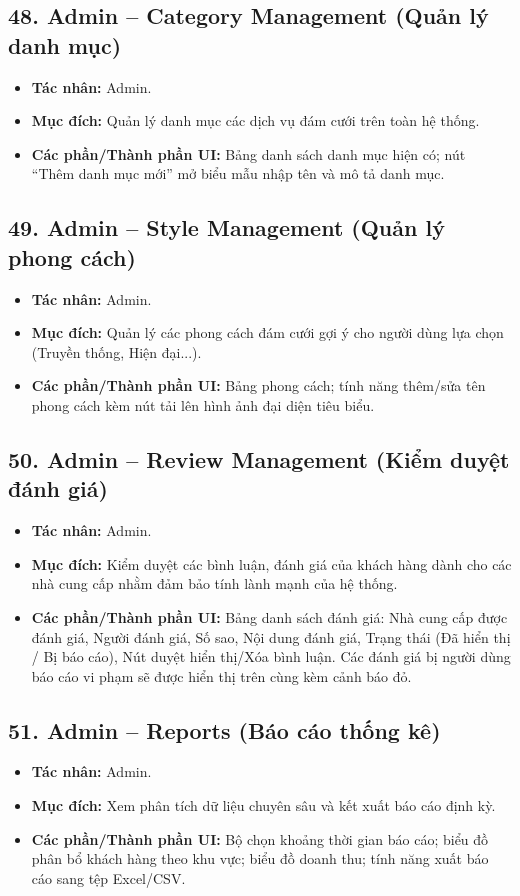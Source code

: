 \documentclass[11pt,a4paper]{article}
\begin{document}
\subsection{48. Admin – Category Management (Quản lý danh mục)}
\begin{itemize}
    \item \textbf{Tác nhân:} Admin.
    \item \textbf{Mục đích:} Quản lý danh mục các dịch vụ đám cưới trên toàn hệ thống.
    \item \textbf{Các phần/Thành phần UI:} Bảng danh sách danh mục hiện có; nút ``Thêm danh mục mới'' mở biểu mẫu nhập tên và mô tả danh mục.
\end{itemize}

\subsection{49. Admin – Style Management (Quản lý phong cách)}
\begin{itemize}
    \item \textbf{Tác nhân:} Admin.
    \item \textbf{Mục đích:} Quản lý các phong cách đám cưới gợi ý cho người dùng lựa chọn (Truyền thống, Hiện đại...).
    \item \textbf{Các phần/Thành phần UI:} Bảng phong cách; tính năng thêm/sửa tên phong cách kèm nút tải lên hình ảnh đại diện tiêu biểu.
\end{itemize}

\subsection{50. Admin – Review Management (Kiểm duyệt đánh giá)}
\begin{itemize}
    \item \textbf{Tác nhân:} Admin.
    \item \textbf{Mục đích:} Kiểm duyệt các bình luận, đánh giá của khách hàng dành cho các nhà cung cấp nhằm đảm bảo tính lành mạnh của hệ thống.
    \item \textbf{Các phần/Thành phần UI:} Bảng danh sách đánh giá: Nhà cung cấp được đánh giá, Người đánh giá, Số sao, Nội dung đánh giá, Trạng thái (Đã hiển thị / Bị báo cáo), Nút duyệt hiển thị/Xóa bình luận. Các đánh giá bị người dùng báo cáo vi phạm sẽ được hiển thị trên cùng kèm cảnh báo đỏ.
\end{itemize}

\subsection{51. Admin – Reports (Báo cáo thống kê)}
\begin{itemize}
    \item \textbf{Tác nhân:} Admin.
    \item \textbf{Mục đích:} Xem phân tích dữ liệu chuyên sâu và kết xuất báo cáo định kỳ.
    \item \textbf{Các phần/Thành phần UI:} Bộ chọn khoảng thời gian báo cáo; biểu đồ phân bổ khách hàng theo khu vực; biểu đồ doanh thu; tính năng xuất báo cáo sang tệp Excel/CSV.
\end{itemize}
\end{document}
